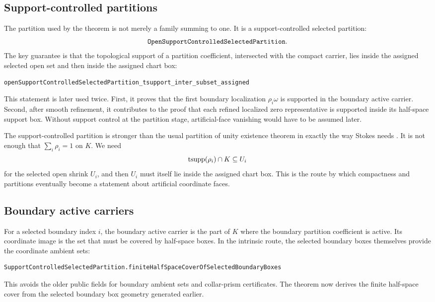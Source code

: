\subsection{Support-controlled partitions}

The partition used by the theorem is not merely a family summing to one.  It is
a support-controlled selected partition:
\[
\code{OpenSupportControlledSelectedPartition}.
\]
The key guarantee is that the topological support of a partition coefficient,
intersected with the compact carrier, lies inside the assigned selected open
set and then inside the assigned chart box:
\begin{lstlisting}[language=Lean]
openSupportControlledSelectedPartition_tsupport_inter_subset_assigned
\end{lstlisting}

This statement is later used twice.  First, it proves that the first boundary
localization \(\rho_i\omega\) is supported in the boundary active carrier.
Second, after smooth refinement, it contributes to the proof that each refined
localized zero representative is supported inside its half-space support box.
Without support control at the partition stage, artificial-face vanishing would
have to be assumed later.

The support-controlled partition is stronger than the usual partition of unity
existence theorem in exactly the way Stokes needs
\cite{guillemin1974differential,hirsch1976differential,warner1983foundations,tu2011introduction}.
It is not enough that
\(\sum_i\rho_i=1\) on \(K\).  We need
\[
  \operatorname{tsupp}(\rho_i)\cap K \subseteq U_i
\]
for the selected open shrink \(U_i\), and then \(U_i\) must itself lie inside
the assigned chart box.  This is the route by which compactness and partitions
eventually become a statement about artificial coordinate faces.

\subsection{Boundary active carriers}

For a selected boundary index \(i\), the boundary active carrier is the part of
\(K\) where the boundary partition coefficient is active.  Its coordinate
image is the set that must be covered by half-space boxes.  In the intrinsic
route, the selected boundary boxes themselves provide the coordinate ambient
sets:
\begin{lstlisting}[language=Lean]
SupportControlledSelectedPartition.finiteHalfSpaceCoverOfSelectedBoundaryBoxes
\end{lstlisting}
This avoids the older public fields for boundary ambient sets and collar-prism
certificates.  The theorem now derives the finite half-space cover from the
selected boundary box geometry generated earlier.

